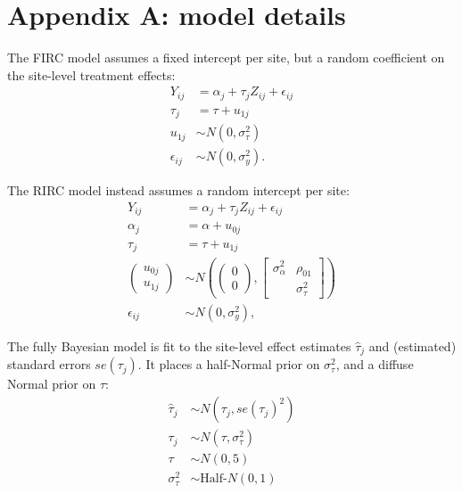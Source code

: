 \documentclass[]{article}
\begin{document}


\appendix
\section{Appendix A: model details}

The FIRC model assumes a fixed intercept per site, but a random coefficient on the site-level treatment effects:
\begin{align*}
	Y_{ij} &= \alpha_j + \tau_j Z_{ij} + \epsilon_{ij} \\
	\tau_j &= \tau + u_{1j} \\
	u_{1j} &\sim N(0, \sigma^2_\tau) \\
	\epsilon_{ij} &\sim N(0, \sigma^2_y).
\end{align*}

The RIRC model instead assumes a random intercept per site:
\begin{align*}
	Y_{ij} &= \alpha_j + \tau_j Z_{ij} + \epsilon_{ij} \\
	\alpha_j &= \alpha + u_{0j} \\
	\tau_j &= \tau + u_{1j} \\
	\begin{pmatrix}
		u_{0j} \\ u_{1j}
	\end{pmatrix} &\sim N\left(
	\begin{pmatrix}
		0 \\ 0
	\end{pmatrix}, 
	\begin{bmatrix}
		\sigma^2_\alpha & \rho_{01} \\  & \sigma^2_\tau
	\end{bmatrix}\right) \\
	\epsilon_{ij} &\sim N(0, \sigma^2_y) ,
\end{align*}

The fully Bayesian model is fit to the site-level effect estimates $\hat{\tau}_j$ and (estimated) standard errors $se(\tau_j)$.
It places a half-Normal prior on $\sigma^2_\tau$, and a diffuse Normal prior on $\tau$:
\begin{align*}
	\hat{\tau}_j &\sim N(\tau_j, se(\tau_j)^2) \\
	\tau_j &\sim N(\tau, \sigma^2_\tau) \\
	\tau &\sim N(0, 5) \\
	\sigma^2_\tau &\sim \text{Half-}N(0, 1)
\end{align*}


	
\end{document}
